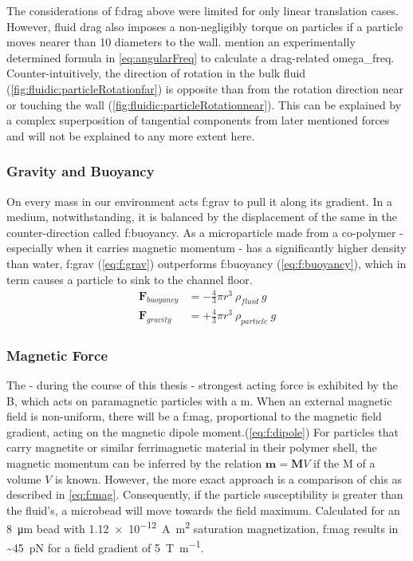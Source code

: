 The considerations of \acrlong{f:drag} above were limited for only linear translation cases. However, fluid drag also imposes a non-negligibly torque on particles if a particle moves nearer than 10 diameters to the wall. \citet{lit:fluid:Hydrodynamics} mention an experimentally determined formula in \ref{eq:angularFreq} to calculate a drag-related \gls{omega_freq}. Counter-intuitively, the direction of rotation in the bulk fluid (\cref{fig:fluidic:particleRotationfar}) is opposite than from the rotation direction near or touching the wall (\cref{fig:fluidic:particleRotationnear}). This can be explained by a complex superposition of tangential components from later mentioned forces and will not be explained to any more extent here.

\subsubsection{Gravity and Buoyancy}
On every mass in our environment acts \gls{f:grav} to pull it along its gradient. In a medium, notwithstanding, it is balanced by the displacement of the same in the counter-direction called \gls{f:buoyancy}. As a microparticle made from a co-polymer - especially when it carries magnetic momentum - has a significantly higher density than water, \gls{f:grav} (\cref{eq:f:grav}) outperforms \gls{f:buoyancy} (\cref{eq:f:buoyancy}), which in term causes a particle to sink to the channel floor.
\begin{align}
	\mathbf{F}_{buoyancy} &= -\frac{4}{3}\pi r^3 \ \rho_{fluid} \ g \label{eq:f:buoyancy}\\
	\mathbf{F}_{gravity} &= +\frac{4}{3}\pi r^3 \ \rho_{particle} \ g \label{eq:f:grav}
\end{align}


\subsubsection{Magnetic Force}
The - during the course of this thesis - strongest acting force is exhibited by the \gls{B}, which acts on paramagnetic particles with a \gls{m}. When an external magnetic field is non-uniform, there will be a \gls{f:mag}, proportional to the magnetic field gradient, acting on the magnetic dipole moment.(\cref{eq:f:dipole}) For particles that carry magnetite or similar ferrimagnetic material in their polymer shell, the magnetic momentum can be inferred by the relation $\mathbf{m} = \mathbf{M} V$ if the \gls{M} of a volume $V$ is known. However, the more exact approach is a comparison of \glspl{chi} as described in \cref{eq:f:mag}. Consequently, if the particle susceptibility is greater than the fluid's, a microbead will move towards the field maximum. Calculated for an \SI{8}{\micro\meter} bead with \SI{1.12e-12}{\ampere\meter\squared} saturation magnetization, \gls{f:mag} results in \textasciitilde{}\SI{45}{\pico\newton} for a field gradient of \SI{5}{\tesla\per\meter}.


